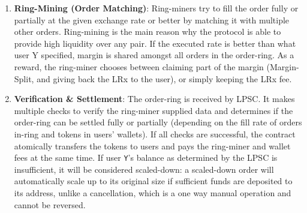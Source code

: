 \documentclass[UTF8,nofonts]{article}
\makeatletter
\newenvironment{figurehere}
 {\def\@captype{figure}}
 {}
\makeatother
\begin{document}
\begin{multicols}{2}
\begin{enumerate}
\begin{center}
\begin{figurehere}

\caption{Loopring Exchange Process}
\label{fig:process}
\end{figurehere}
\end{center}



\item \textbf{Ring-Mining (Order Matching)}:  Ring-miners try to fill the order fully or partially at the given exchange rate or better by matching it with multiple other orders. Ring-mining is the main reason why the protocol is able to provide high liquidity over any pair. If the executed rate is better than what user Y specified, margin is shared amongst all orders in the order-ring. As a reward, the ring-miner chooses between claiming part of the margin (Margin-Split, and giving back the LRx to the user), or simply keeping the LRx fee.

\item \textbf{Verification \& Settlement}: The order-ring is received by LPSC. It makes multiple checks to verify the ring-miner supplied data and determines if the order-ring can be settled fully or partially (depending on the fill rate of orders in-ring and tokens in users' wallets). If all checks are successful, the contract atomically transfers the tokens to users and pays the ring-miner and wallet fees at the same time. If user \verb|Y|'s balance as determined by the LPSC is insufficient, it will be considered scaled-down: a scaled-down order will automatically scale up to its original size if sufficient funds are deposited to its address, unlike a cancellation, which is a one way manual operation and cannot be reversed.



\end{enumerate}
\end{multicols}
\end{document}
